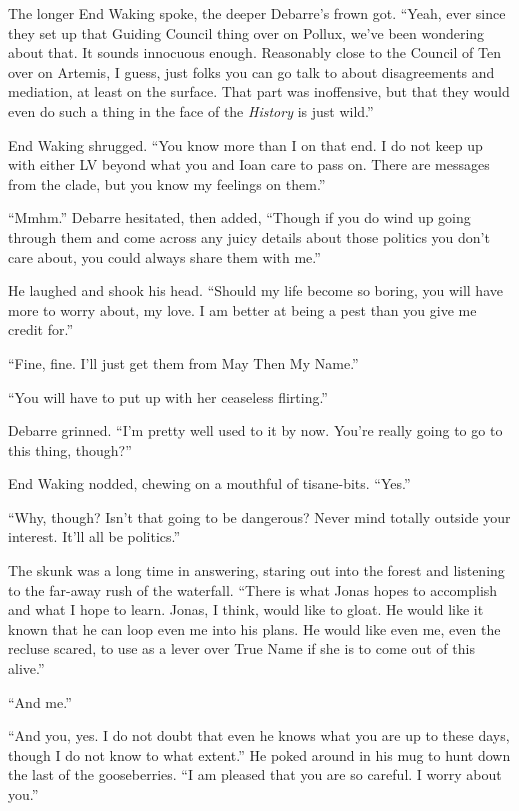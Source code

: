 The longer End Waking spoke, the deeper Debarre's frown got. ``Yeah, ever since they set up that Guiding Council thing over on Pollux, we've been wondering about that. It sounds innocuous enough. Reasonably close to the Council of Ten over on Artemis, I guess, just folks you can go talk to about disagreements and mediation, at least on the surface. That part was inoffensive, but that they would even do such a thing in the face of the \emph{History} is just wild.''

End Waking shrugged. ``You know more than I on that end. I do not keep up with either LV beyond what you and Ioan care to pass on. There are messages from the clade, but you know my feelings on them.''

``Mmhm.'' Debarre hesitated, then added, ``Though if you do wind up going through them and come across any juicy details about those politics you don't care about, you could always share them with me.''

He laughed and shook his head. ``Should my life become so boring, you will have more to worry about, my love. I am better at being a pest than you give me credit for.''

``Fine, fine. I'll just get them from May Then My Name.''

``You will have to put up with her ceaseless flirting.''

Debarre grinned. ``I'm pretty well used to it by now. You're really going to go to this thing, though?''

End Waking nodded, chewing on a mouthful of tisane-bits. ``Yes.''

``Why, though? Isn't that going to be dangerous? Never mind totally outside your interest. It'll all be politics.''

The skunk was a long time in answering, staring out into the forest and listening to the far-away rush of the waterfall. ``There is what Jonas hopes to accomplish and what I hope to learn. Jonas, I think, would like to gloat. He would like it known that he can loop even me into his plans. He would like even me, even the recluse scared, to use as a lever over True Name if she is to come out of this alive.''

``And me.''

``And you, yes. I do not doubt that even he knows what you are up to these days, though I do not know to what extent.'' He poked around in his mug to hunt down the last of the gooseberries. ``I am pleased that you are so careful. I worry about you.''

